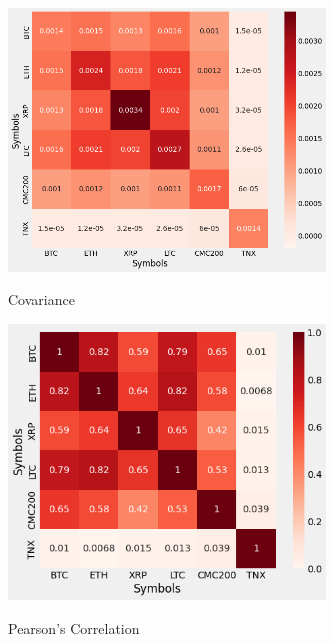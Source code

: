 \begin{figure}[!ht]
    \centering
    \caption{Covariance}
    \label{fig:cov} 
    \includegraphics[width=0.75\textwidth,height=\textheight,keepaspectratio]{images/covariance_heatmap.png}
    \\
    
\end{figure} 

\begin{figure}[!ht]
    \centering
    \caption{Pearson's Correlation}
    \label{fig:pearson}
    \includegraphics[width=0.75\textwidth,height=\textheight,keepaspectratio]{images/pearson_heatmap.png}
    \\
    
\end{figure}
